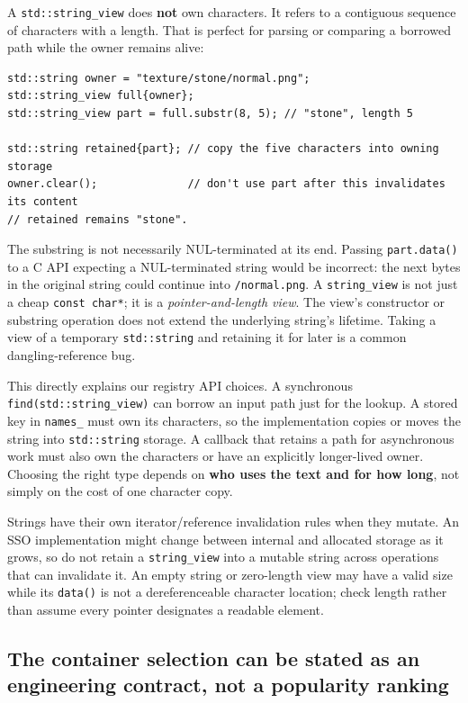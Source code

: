 A \texttt{std::string\_view} does \textbf{not} own characters. It refers to a contiguous sequence of characters with a length. That is perfect for parsing or comparing a borrowed path while the owner remains alive:

\begin{verbatim}
std::string owner = "texture/stone/normal.png";
std::string_view full{owner};
std::string_view part = full.substr(8, 5); // "stone", length 5

std::string retained{part}; // copy the five characters into owning storage
owner.clear();              // don't use part after this invalidates its content
// retained remains "stone".
\end{verbatim}

The substring is not necessarily NUL-terminated at its end. Passing \texttt{part.data()} to a C API expecting a NUL-terminated string would be incorrect: the next bytes in the original string could continue into \texttt{/normal.png}. A \texttt{string\_view} is not just a cheap \texttt{const\ char*}; it is a \emph{pointer-and-length view}. The view's constructor or substring operation does not extend the underlying string's lifetime. Taking a view of a temporary \texttt{std::string} and retaining it for later is a common dangling-reference bug.

This directly explains our registry API choices. A synchronous \texttt{find(std::string\_view)} can borrow an input path just for the lookup. A stored key in \texttt{names\_} must own its characters, so the implementation copies or moves the string into \texttt{std::string} storage. A callback that retains a path for asynchronous work must also own the characters or have an explicitly longer-lived owner. Choosing the right type depends on \textbf{who uses the text and for how long}, not simply on the cost of one character copy.

Strings have their own iterator/reference invalidation rules when they mutate. An SSO implementation might change between internal and allocated storage as it grows, so do not retain a \texttt{string\_view} into a mutable string across operations that can invalidate it. An empty string or zero-length view may have a valid size while its \texttt{data()} is not a dereferenceable character location; check length rather than assume every pointer designates a readable element.

\subsection{The container selection can be stated as an engineering contract, not a popularity ranking}\label{05-engine-i-ch005-the-container-selection-can-be-stated-as-an-engineering-contract-not-a-popularity-ranking}

